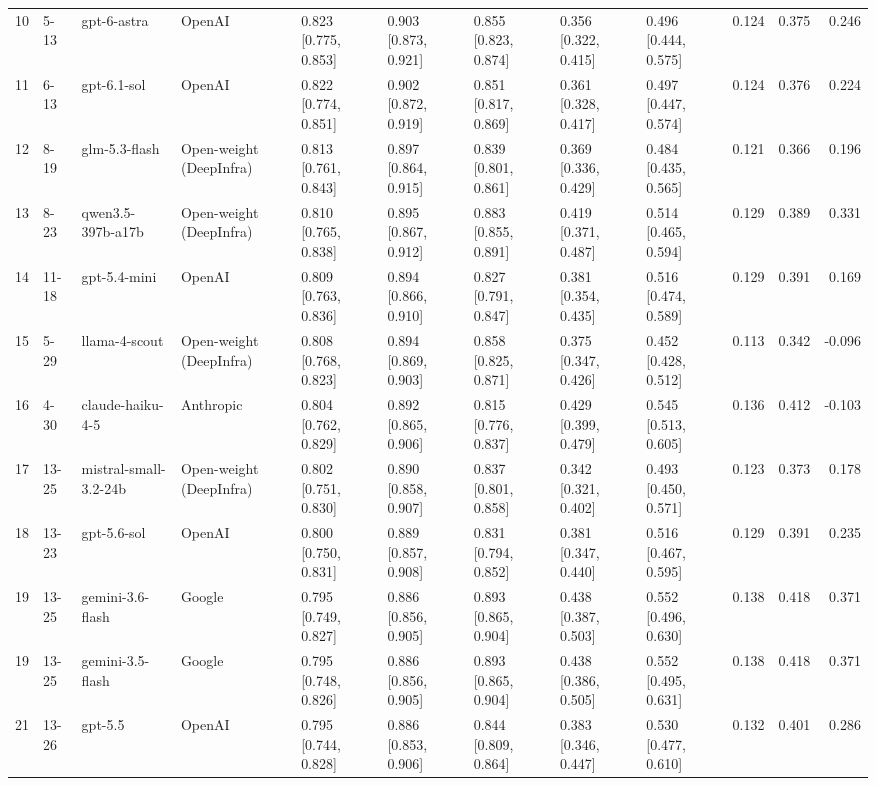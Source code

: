 \begin{table}
\begin{tabular}{rllllllllrrr}
10 & 5-13 & gpt-6-astra & OpenAI & 0.823 [0.775, 0.853] & 0.903 [0.873, 0.921] & 0.855 [0.823, 0.874] & 0.356 [0.322, 0.415] & 0.496 [0.444, 0.575] & 0.124 & 0.375 & 0.246 \\
11 & 6-13 & gpt-6.1-sol & OpenAI & 0.822 [0.774, 0.851] & 0.902 [0.872, 0.919] & 0.851 [0.817, 0.869] & 0.361 [0.328, 0.417] & 0.497 [0.447, 0.574] & 0.124 & 0.376 & 0.224 \\
12 & 8-19 & glm-5.3-flash & Open-weight (DeepInfra) & 0.813 [0.761, 0.843] & 0.897 [0.864, 0.915] & 0.839 [0.801, 0.861] & 0.369 [0.336, 0.429] & 0.484 [0.435, 0.565] & 0.121 & 0.366 & 0.196 \\
13 & 8-23 & qwen3.5-397b-a17b & Open-weight (DeepInfra) & 0.810 [0.765, 0.838] & 0.895 [0.867, 0.912] & 0.883 [0.855, 0.891] & 0.419 [0.371, 0.487] & 0.514 [0.465, 0.594] & 0.129 & 0.389 & 0.331 \\
14 & 11-18 & gpt-5.4-mini & OpenAI & 0.809 [0.763, 0.836] & 0.894 [0.866, 0.910] & 0.827 [0.791, 0.847] & 0.381 [0.354, 0.435] & 0.516 [0.474, 0.589] & 0.129 & 0.391 & 0.169 \\
15 & 5-29 & llama-4-scout & Open-weight (DeepInfra) & 0.808 [0.768, 0.823] & 0.894 [0.869, 0.903] & 0.858 [0.825, 0.871] & 0.375 [0.347, 0.426] & 0.452 [0.428, 0.512] & 0.113 & 0.342 & -0.096 \\
16 & 4-30 & claude-haiku-4-5 & Anthropic & 0.804 [0.762, 0.829] & 0.892 [0.865, 0.906] & 0.815 [0.776, 0.837] & 0.429 [0.399, 0.479] & 0.545 [0.513, 0.605] & 0.136 & 0.412 & -0.103 \\
17 & 13-25 & mistral-small-3.2-24b & Open-weight (DeepInfra) & 0.802 [0.751, 0.830] & 0.890 [0.858, 0.907] & 0.837 [0.801, 0.858] & 0.342 [0.321, 0.402] & 0.493 [0.450, 0.571] & 0.123 & 0.373 & 0.178 \\
18 & 13-23 & gpt-5.6-sol & OpenAI & 0.800 [0.750, 0.831] & 0.889 [0.857, 0.908] & 0.831 [0.794, 0.852] & 0.381 [0.347, 0.440] & 0.516 [0.467, 0.595] & 0.129 & 0.391 & 0.235 \\
19 & 13-25 & gemini-3.6-flash & Google & 0.795 [0.749, 0.827] & 0.886 [0.856, 0.905] & 0.893 [0.865, 0.904] & 0.438 [0.387, 0.503] & 0.552 [0.496, 0.630] & 0.138 & 0.418 & 0.371 \\
19 & 13-25 & gemini-3.5-flash & Google & 0.795 [0.748, 0.826] & 0.886 [0.856, 0.905] & 0.893 [0.865, 0.904] & 0.438 [0.386, 0.505] & 0.552 [0.495, 0.631] & 0.138 & 0.418 & 0.371 \\
21 & 13-26 & gpt-5.5 & OpenAI & 0.795 [0.744, 0.828] & 0.886 [0.853, 0.906] & 0.844 [0.809, 0.864] & 0.383 [0.346, 0.447] & 0.530 [0.477, 0.610] & 0.132 & 0.401 & 0.286 \\

\end{tabular}
\end{table}
